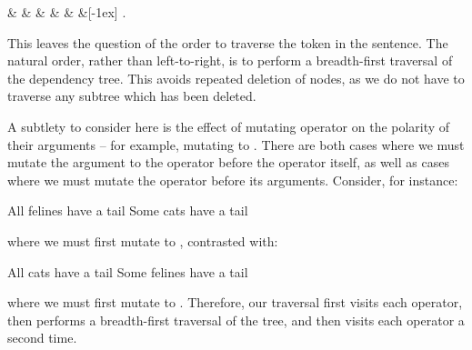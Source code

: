 \begin{center}
\begin{dependency}[text only label, label style={above}]
  \begin{deptext}[column sep=-0.00cm]
     \&  \&  \& 
       \&  \&  \&[-1ex] .\\
  \end{deptext}
\end{dependency}
\end{center}

This leaves the question of the order to traverse the token in the sentence.
The natural order, rather than left-to-right, is to perform a breadth-first
  traversal of the dependency tree.
This avoids repeated deletion of nodes, as we do not have to traverse any
  subtree which has been deleted.

A subtlety to consider here is the effect of mutating operator on the
  polarity of their arguments -- for example, mutating  to
  .
There are both cases where we must mutate the argument to the operator before
  the operator itself, as well as cases where we must mutate the operator
  before its arguments.
Consider, for instance:

\entailmentExample
{All felines have a tail}
{Some cats have a tail}

\noindent where we must first mutate  to , contrasted with:

\entailmentExample
{All cats have a tail}
{Some felines have a tail}

\noindent where we must first mutate  to .
Therefore, our traversal first visits each operator, then performs a breadth-first
  traversal of the tree, and then visits each operator a second time.

